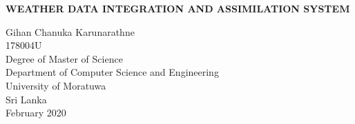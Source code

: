 \documentclass[a4paper,oneside,12pt]{report}
\begin{document}
\begin{titlepage}
    \begin{center}
        \Large{
        \textbf{WEATHER DATA INTEGRATION AND ASSIMILATION SYSTEM}}\\
        \vspace{144pt}
  \large      
       
        
        
        Gihan Chanuka Karunarathne\\
        \vspace{24pt}
      178004U\\
         \vspace{72pt}
        Degree of Master of Science\\
       
        
       \vspace{72pt}
        \large
        Department of Computer Science and Engineering\\
        \vspace{24pt}
        University of Moratuwa\\
        Sri Lanka\\
        \vspace{32pt}
        February 2020
        
    \end{center}
\end{titlepage}
\end{document}
